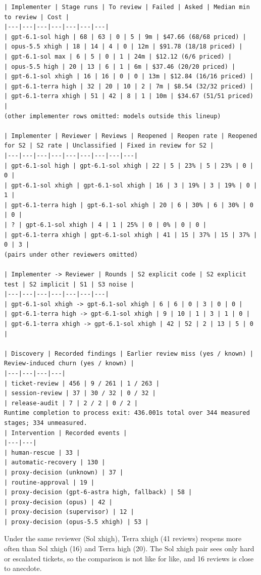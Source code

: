 \documentclass[11pt,a4paper]{article}
\begin{document}
{\tiny
\begin{verbatim}
| Implementer | Stage runs | To review | Failed | Asked | Median min to review | Cost |
|---|---|---|---|---|---|---|
| gpt-6.1-sol high | 68 | 63 | 0 | 5 | 9m | $47.66 (68/68 priced) |
| opus-5.5 xhigh | 18 | 14 | 4 | 0 | 12m | $91.78 (18/18 priced) |
| gpt-6.1-sol max | 6 | 5 | 0 | 1 | 24m | $12.12 (6/6 priced) |
| opus-5.5 high | 20 | 13 | 6 | 1 | 6m | $37.46 (20/20 priced) |
| gpt-6.1-sol xhigh | 16 | 16 | 0 | 0 | 13m | $12.84 (16/16 priced) |
| gpt-6.1-terra high | 32 | 20 | 10 | 2 | 7m | $8.54 (32/32 priced) |
| gpt-6.1-terra xhigh | 51 | 42 | 8 | 1 | 10m | $34.67 (51/51 priced) |
(other implementer rows omitted: models outside this lineup)

| Implementer | Reviewer | Reviews | Reopened | Reopen rate | Reopened for S2 | S2 rate | Unclassified | Fixed in review for S2 |
|---|---|---|---|---|---|---|---|---|
| gpt-6.1-sol high | gpt-6.1-sol xhigh | 22 | 5 | 23% | 5 | 23% | 0 | 0 |
| gpt-6.1-sol xhigh | gpt-6.1-sol xhigh | 16 | 3 | 19% | 3 | 19% | 0 | 1 |
| gpt-6.1-terra high | gpt-6.1-sol xhigh | 20 | 6 | 30% | 6 | 30% | 0 | 0 |
| ? | gpt-6.1-sol xhigh | 4 | 1 | 25% | 0 | 0% | 0 | 0 |
| gpt-6.1-terra xhigh | gpt-6.1-sol xhigh | 41 | 15 | 37% | 15 | 37% | 0 | 3 |
(pairs under other reviewers omitted)

| Implementer -> Reviewer | Rounds | S2 explicit code | S2 explicit test | S2 implicit | S1 | S3 noise |
|---|---|---|---|---|---|---|
| gpt-6.1-sol xhigh -> gpt-6.1-sol xhigh | 6 | 6 | 0 | 3 | 0 | 0 |
| gpt-6.1-terra high -> gpt-6.1-sol xhigh | 9 | 10 | 1 | 3 | 1 | 0 |
| gpt-6.1-terra xhigh -> gpt-6.1-sol xhigh | 42 | 52 | 2 | 13 | 5 | 0 |

| Discovery | Recorded findings | Earlier review miss (yes / known) | Review-induced churn (yes / known) |
|---|---|---|---|
| ticket-review | 456 | 9 / 261 | 1 / 263 |
| session-review | 37 | 30 / 32 | 0 / 32 |
| release-audit | 7 | 2 / 2 | 0 / 2 |
Runtime completion to process exit: 436.001s total over 344 measured stages; 334 unmeasured.
| Intervention | Recorded events |
|---|---|
| human-rescue | 33 |
| automatic-recovery | 130 |
| proxy-decision (unknown) | 37 |
| routine-approval | 19 |
| proxy-decision (gpt-6-astra high, fallback) | 58 |
| proxy-decision (opus) | 42 |
| proxy-decision (supervisor) | 12 |
| proxy-decision (opus-5.5 xhigh) | 53 |
\end{verbatim}
}

Under the same reviewer (Sol xhigh), Terra xhigh (41 reviews) reopens more often than Sol xhigh
(16) and Terra high (20). The Sol xhigh pair sees only hard or escalated tickets, so the
comparison is not like for like, and 16 reviews is close to anecdote.
\end{document}

